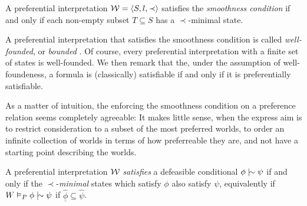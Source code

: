 \begin{definition}
  \label{definition:smoothness} A preferential interpretation $\mathcal{W} = \langle S,l,\prec \rangle$ satisfies the \textit{smoothness condition} if and only if each non-empty
  subset $T \subseteq S$ has a $\prec$-minimal state.
\end{definition}

A preferential interpretation that satisfies the smoothness condition is called \textit{well-founded}, or \textit{bounded}
\cite{shohamSemanticApproach,lehmann1992what}. Of course, every preferential interpretation with a finite set of states is well-founded. We then
remark that the, under the assumption of well-foundeness, a formula is (classically) satisfiable if and only if it is preferentially satisfiable.

As a matter of intuition, the enforcing the smoothness condition on a preference relation seems completely agreeable: It makes little sense,
when the express aim is to restrict consideration to a subset of the most preferred worlds, to order an infinite collection of worlds in terms
of how preferreable they are, and not have a starting point describing the  worlds.

\begin{definition}
  \label{definition:preferential-satisfaction} A preferential interpretation $\mathcal{W}$ \emph{satisfies} a defeasible conditional
  $\phi \twiddle \psi$ if and only if the $\prec$-\emph{minimal} states which satisfy $\phi$ also satisfy $\psi$, equivalently if
  $W \vDash_{P}\phi \twiddle \psi$ if $\underline{\hat{\phi}}\subseteq \hat{\psi}$.
\end{definition}

